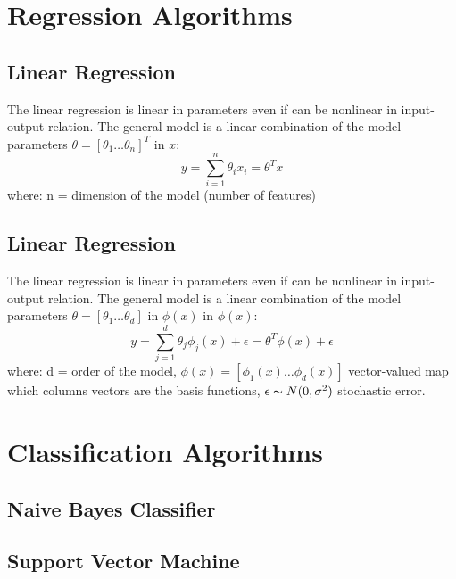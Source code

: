 \documentclass[11pt]{article}
\begin{document}
    \section{Regression Algorithms}
    
        \subsection{Linear Regression}
            The linear regression is linear in parameters even if can be nonlinear in input-output relation. The general model is a linear combination of the model parameters $\theta=[\theta_1 \hdots \theta_n]^T$ in $x$:
            \begin{equation}
                y = \sum_{i=1}^{n} \theta_i x_i = \theta^T x
            \end{equation}
            where: n = dimension of the model (number of features)
            
            
        
        \subsection{Linear Regression}
            The linear regression is linear in parameters even if can be nonlinear in input-output relation. The general model is a linear combination of the model parameters $\theta=[\theta_1 \hdots \theta_d]$ in $\phi(x)$ in $\phi(x)$:
            \begin{equation}
                y = \sum_{j=1}^{d} \theta_j \phi_j(x) + \epsilon = \theta^T \phi(x) + \epsilon
            \end{equation}
            where: d = order of the model, $\phi(x)=[\phi_1(x) \hdots \phi_d(x)]$ vector-valued map which columns vectors are the basis functions, $\epsilon \thicksim N(0, \sigma^2)$ stochastic error.


    \section{Classification Algorithms}

        \subsection{Naive Bayes Classifier}

        \subsection{Support Vector Machine}
\end{document}
